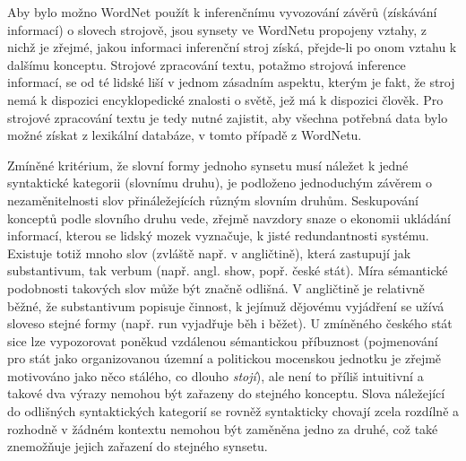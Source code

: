 \documentclass[a4paper, 11pt, oneside]{book}
\newcommand{\itNameRef}[1]{\textit{\nameref{#1}}}
\newcommand\ex{\textsf}
\begin{document}
					Aby bylo možno WordNet použít k inferenčnímu vyvozování závěrů (získávání informací) o slovech strojově, jsou synsety ve WordNetu propojeny vztahy, z nichž je zřejmé, jakou informaci inferenční stroj získá, přejde-li po onom vztahu k dalšímu konceptu. Strojové zpracování textu, potažmo strojová inference informací, se od té lidské liší v jednom zásadním aspektu, kterým je fakt, že stroj nemá k dispozici encyklopedické znalosti o světě, jež má k dispozici člověk. Pro strojové zpracování textu je tedy nutné zajistit, aby všechna potřebná data bylo možné získat z lexikální databáze, v tomto případě z WordNetu.

					Zmíněné kritérium, že slovní formy jednoho synsetu musí náležet k jedné syntaktické kategorii (slovnímu druhu), je podloženo jednoduchým závěrem o nezaměnitelnosti slov přináležejících různým slovním druhům. %
					Seskupování konceptů podle slovního druhu vede, zřejmě navzdory snaze o ekonomii ukládání informací, kterou se lidský mozek vyznačuje, k jisté redundantnosti systému. Existuje totiž mnoho slov (zvláště např. v angličtině), která zastupují jak substantivum, tak verbum (např. angl. \ex{show}, popř. české \ex{stát}). Míra sémantické podobnosti takových slov může být značně odlišná. V angličtině je relativně běžné, že substantivum popisuje činnost, k jejímuž dějovému vyjádření se užívá sloveso stejné formy (např. \ex{run} vyjadřuje \ex{běh} i \ex{běžet}). U zmíněného českého \ex{stát} sice lze vypozorovat poněkud vzdálenou sémantickou příbuznost (pojmenování pro stát jako organizovanou územní a politickou mocenskou jednotku \parencite{Dorling2003oxforddic} je zřejmě motivováno jako něco stálého, co dlouho \textit{stojí}), ale není to příliš intuitivní a takové dva výrazy nemohou být zařazeny do stejného konceptu. Slova náležející do odlišných syntaktických kategorií se rovněž syntakticky chovají zcela rozdílně a rozhodně v žádném kontextu nemohou být zaměněna jedno za druhé, což také znemožňuje jejich zařazení do stejného synsetu. \parencite{miller1990introduction} 
\end{document}
